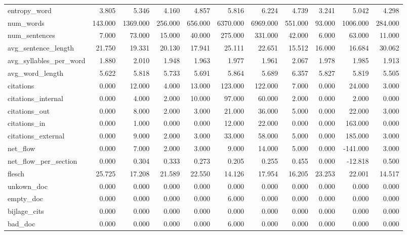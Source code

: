 \begin{tabular}{lrrrrrrrrrr}
\cline{1-11}
entropy\_word & 3.805 & 5.346 & 4.160 & 4.857 & 5.816 & 6.224 & 4.739 & 3.241 & 5.042 & 4.298 \\
\cline{1-11}
num\_words & 143.000 & 1369.000 & 256.000 & 656.000 & 6370.000 & 6969.000 & 551.000 & 93.000 & 1006.000 & 284.000 \\
\cline{1-11}
num\_sentences & 7.000 & 73.000 & 15.000 & 40.000 & 275.000 & 331.000 & 42.000 & 6.000 & 63.000 & 11.000 \\
\cline{1-11}
avg\_sentence\_length & 21.750 & 19.331 & 20.130 & 17.941 & 25.111 & 22.651 & 15.512 & 16.000 & 16.684 & 30.062 \\
\cline{1-11}
avg\_syllables\_per\_word & 1.880 & 2.010 & 1.948 & 1.963 & 1.977 & 1.961 & 2.067 & 1.978 & 1.985 & 1.913 \\
\cline{1-11}
avg\_word\_length & 5.622 & 5.818 & 5.733 & 5.691 & 5.864 & 5.689 & 6.357 & 5.827 & 5.819 & 5.505 \\
\cline{1-11}
citations & 0.000 & 12.000 & 4.000 & 13.000 & 123.000 & 122.000 & 7.000 & 0.000 & 24.000 & 3.000 \\
\cline{1-11}
citations\_internal & 0.000 & 4.000 & 2.000 & 10.000 & 97.000 & 60.000 & 2.000 & 0.000 & 2.000 & 0.000 \\
\cline{1-11}
citations\_out & 0.000 & 8.000 & 2.000 & 3.000 & 21.000 & 36.000 & 5.000 & 0.000 & 22.000 & 3.000 \\
\cline{1-11}
citations\_in & 0.000 & 1.000 & 0.000 & 0.000 & 12.000 & 22.000 & 0.000 & 0.000 & 163.000 & 0.000 \\
\cline{1-11}
citations\_external & 0.000 & 9.000 & 2.000 & 3.000 & 33.000 & 58.000 & 5.000 & 0.000 & 185.000 & 3.000 \\
\cline{1-11}
net\_flow & 0.000 & 7.000 & 2.000 & 3.000 & 9.000 & 14.000 & 5.000 & 0.000 & -141.000 & 3.000 \\
\cline{1-11}
net\_flow\_per\_section & 0.000 & 0.304 & 0.333 & 0.273 & 0.205 & 0.255 & 0.455 & 0.000 & -12.818 & 0.500 \\
\cline{1-11}
flesch & 25.725 & 17.208 & 21.589 & 22.550 & 14.126 & 17.954 & 16.205 & 23.253 & 22.001 & 14.517 \\
\cline{1-11}
unkown\_doc & 0.000 & 0.000 & 0.000 & 0.000 & 0.000 & 0.000 & 0.000 & 0.000 & 0.000 & 0.000 \\
\cline{1-11}
empty\_doc & 0.000 & 0.000 & 0.000 & 0.000 & 6.000 & 0.000 & 0.000 & 0.000 & 0.000 & 0.000 \\
\cline{1-11}
bijlage\_cits & 0.000 & 0.000 & 0.000 & 0.000 & 0.000 & 0.000 & 0.000 & 0.000 & 0.000 & 0.000 \\
\cline{1-11}
bad\_doc & 0.000 & 0.000 & 0.000 & 0.000 & 6.000 & 0.000 & 0.000 & 0.000 & 0.000 & 0.000 \\
\cline{1-11}
\bottomrule
\end{tabular}
